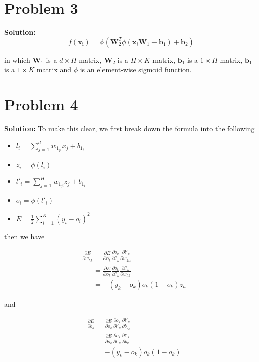 \documentclass[11pt]{article}
\begin{document}
    
\section*{Problem 3}
\textbf{Solution:} 
\[f(\mathbf{x_i}) = \phi(\mathbf{W}_2^T\phi(\mathbf{x}_i\mathbf{W}_1 + \mathbf{b}_1) + \mathbf{b}_2)\]

in which $\mathbf{W}_1$ is a $d \times H$ matrix, $\mathbf{W}_2$ is a $H \times K$ matrix, $\mathbf{b}_1$ is a $1 \times H$ matrix, $\mathbf{b}_1$ is a $1 \times K$ matrix and $\phi$ is an element-wise sigmoid function.
\section*{Problem 4}
\textbf{Solution:} 
	To make this clear, we first break down the formula into the following
	\begin{itemize}
		\item $l_{i} = \sum_{j = 1}^d w_{1_{ji}}x_{j} + b_{1_{i}}$
		\item $z_{i} = \phi(l_i)$
		\item $l'_{i} = \sum_{j = 1}^H w_{1_{ji}}z_{j} + b_{1_{i}}$
		\item $o_{i} = \phi(l'_{i})$
		\item $E = \frac{1}{2}\sum_{i = 1}^K(y_i - o_i)^2$
	\end{itemize}
	
	then we have 
	
	\begin{align}
		&\frac{\partial E}{\partial w_{hk}} = \frac{\partial E}{\partial o_k}\frac{\partial o_k}{\partial l'_k}\frac{\partial l'_k}{\partial w_{2_{hk}}}\nonumber\\
		&\phantom{\frac{\partial E}{\partial w_{hk}}} = \frac{\partial E}{\partial o_k}\frac{\partial o_k}{\partial l'_k}\frac{\partial l'_k}{\partial w_{hk}}\nonumber\\
		&\phantom{\frac{\partial E}{\partial w_{hk}}} = - (y_k - o_k)o_k(1 - o_k)z_{h}\nonumber
	\end{align}
	
	and 
	
	\begin{align}
		&\frac{\partial E}{\partial b_{k}} = \frac{\partial E}{\partial o_k}\frac{\partial o_k}{\partial l'_k}\frac{\partial l'_k}{\partial b_{2_{k}}}\nonumber\\
		&\phantom{\frac{\partial E}{\partial b_{k}}} = \frac{\partial E}{\partial o_k}\frac{\partial o_k}{\partial l'_k}\frac{\partial l'_k}{\partial b_{k}}\nonumber\\
		&\phantom{\frac{\partial E}{\partial b_{k}}} = - (y_k - o_k)o_k(1 - o_k)\nonumber
	\end{align}
	
\end{document}
